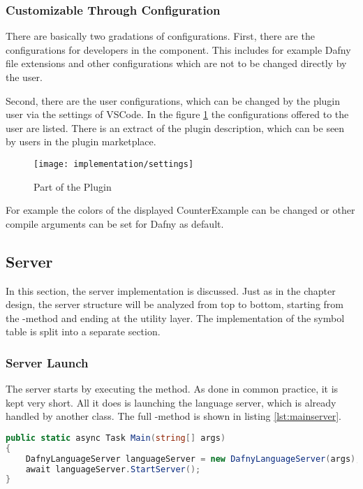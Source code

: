 \subsubsection{Customizable Through Configuration}
There are basically two gradations of configurations.
First, there are the configurations for developers in the  component.
This includes for example Dafny file extensions and other configurations which are not to be changed directly by the user.

Second, there are the user configurations, which can be changed by the plugin user via the settings of VSCode.
In the figure \ref{fig:settings} the configurations offered to the user are listed.
There is an extract of the plugin description, which can be seen by users in the plugin marketplace.

\begin{figure}[H]
    \centering
    \texttt{[image: implementation/settings]}
    \caption{Part of the Plugin }
    \label{fig:settings}
\end{figure}

For example the colors of the displayed CounterExample can be changed or other compile arguments can be set for Dafny as default.

\subsection{Server}
In this section, the server implementation is discussed.
Just as in the chapter design, the server structure will be analyzed from top to bottom, starting from the -method and ending at the utility layer.
The implementation of the symbol table is split into a separate section.

\subsubsection{Server Launch}
The server starts by executing the  method.
As done in common practice, it is kept very short.
All it does is launching the language server, which is already handled by another class.
The full -method is shown in listing \ref{lst:mainserver}.

\begin{lstlisting}[language=csharp, caption={Main Function}, captionpos=b, label={lst:mainserver}]
public static async Task Main(string[] args)
{
    DafnyLanguageServer languageServer = new DafnyLanguageServer(args);
    await languageServer.StartServer();
}
\end{lstlisting}

